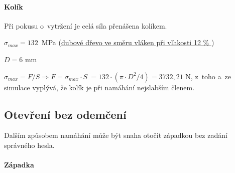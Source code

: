 \begin{table}[h]
    \centering
    \caption{Tabulka značení veličin pro napětí v~kolíku v~tahu}
    \label{tab:M3_symboly_kolik}
\end{table}

\paragraph*{Kolík}
Při pokusu o~vytržení je celá síla přenášena kolíkem.

\noindent $ \sigma_{max} = 132  $~MPa (\href{https://is.mendelu.cz/eknihovna/opory/zobraz_cast.pl?fit_w=1;cast=9190}{dubové dřevo ve směru vláken při vlhkosti 12 \% }\parencite{pevnost_dreva}) %

\noindent $D = 6$ mm

\noindent \(\sigma_{max} = F/S \Rightarrow F = \sigma_{max} \cdot S~= 132 \cdot (\pi \cdot D^2/4) = 3 732,21 \) N,  z~toho a~ze simulace vyplývá, že kolík je při namáhání nejslabším členem.

\subsection*{Otevření bez odemčení}


Dalším způsobem namáhání může být snaha otočit západkou bez zadání správného hesla.

\paragraph*{Západka}

